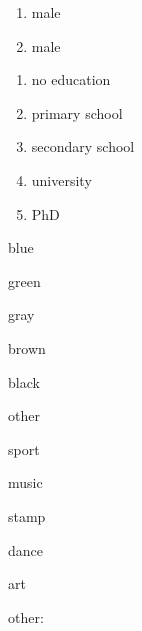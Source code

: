 \documentclass[10pt,a4paper]{scrreprt}
\begin{document}
 \linetext{}



	\begin{enumerate}
	\item male
	\item male
	\end{enumerate}

	\xxbox


	\begin{enumerate}
	\item no education%
	\item primary school
	\item secondary school
	\item university
	\item PhD
	\end{enumerate}


	\xxxbox

	\xxxbox


	\begin{answersC}
	\item blue
	\item green
	\item gray
	\item brown
	\item black
	\item other%
	\end{answersC}


	\begin{answersB}
	\item sport
	\item music
	\item stamp
	\item dance
	\item art
	\item other: \linetext{}
	\end{answersB}


	 \hupCten 



\monthandyearA
\end{document}
